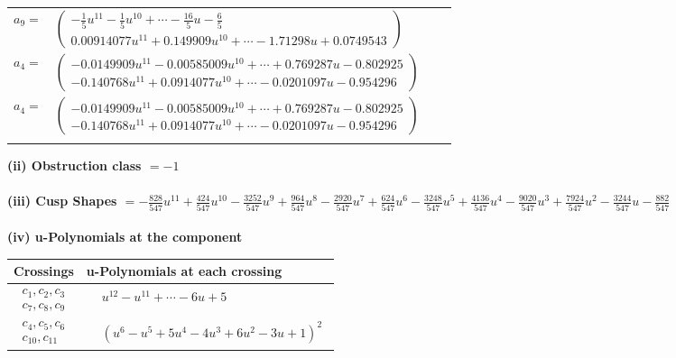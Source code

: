 \documentclass[1p]{elsarticle_modified}
\theoremstyle{definition}
\begin{document}
\begin{tabular}{m{7pt} m{180pt} m{7pt} m{180pt} }
\flushright $a_{9}=$&$\begin{pmatrix}-\frac{1}{5} u^{11}-\frac{1}{5} u^{10}+\cdots-\frac{16}{5} u-\frac{6}{5}\\0.00914077 u^{11}+0.149909 u^{10}+\cdots-1.71298 u+0.0749543\end{pmatrix}$ \\
\flushright $a_{4}=$&$\begin{pmatrix}-0.0149909 u^{11}-0.00585009 u^{10}+\cdots+0.769287 u-0.802925\\-0.140768 u^{11}+0.0914077 u^{10}+\cdots-0.0201097 u-0.954296\end{pmatrix}$\\ \flushright $a_{4}=$&$\begin{pmatrix}-0.0149909 u^{11}-0.00585009 u^{10}+\cdots+0.769287 u-0.802925\\-0.140768 u^{11}+0.0914077 u^{10}+\cdots-0.0201097 u-0.954296\end{pmatrix}$\\&\end{tabular}
\flushleft \textbf{(ii) Obstruction class $= -1$}\\~\\
\flushleft \textbf{(iii) Cusp Shapes $= -\frac{828}{547} u^{11}+\frac{424}{547} u^{10}-\frac{3252}{547} u^9+\frac{964}{547} u^8-\frac{2920}{547} u^7+\frac{624}{547} u^6-\frac{3248}{547} u^5+\frac{4136}{547} u^4-\frac{9020}{547} u^3+\frac{7924}{547} u^2-\frac{3244}{547} u-\frac{882}{547}$}\\~\\
\newpage\renewcommand{\arraystretch}{1}
\flushleft \textbf{(iv) u-Polynomials at the component}\newline \\
\begin{tabular}{m{50pt}|m{274pt}}
Crossings & \hspace{64pt}u-Polynomials at each crossing \\
\hline $$\begin{aligned}c_{1},c_{2},c_{3}\\c_{7},c_{8},c_{9}\end{aligned}$$&$\begin{aligned}
&u^{12}- u^{11}+\cdots-6 u+5
\end{aligned}$\\
\hline $$\begin{aligned}c_{4},c_{5},c_{6}\\c_{10},c_{11}\end{aligned}$$&$\begin{aligned}
&(u^6- u^5+5 u^4-4 u^3+6 u^2-3 u+1)^2
\end{aligned}$\\
\hline
\end{tabular}\\~\\
\end{document}
